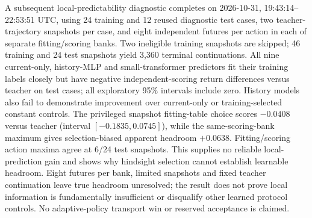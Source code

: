 \documentclass[11pt]{article}
\begin{document}
A subsequent local-predictability diagnostic completes on 2026-10-31,
19:43:14--22:53:51 UTC, using 24 training and 12 reused diagnostic test cases,
two teacher-trajectory snapshots per case, and eight independent futures per
action in each of separate fitting/scoring banks. Two ineligible training
snapshots are skipped; 46 training and 24 test snapshots yield 3,360 terminal
continuations. All nine current-only, history-MLP and small-transformer predictors
fit their training labels closely but have negative independent-scoring return
differences versus teacher on test cases; all exploratory 95\% intervals include
zero. History models also fail to demonstrate improvement over current-only or
training-selected constant controls. The privileged snapshot fitting-table
choice scores $-0.0408$ versus teacher (interval $[-0.1835,0.0745]$), while the
same-scoring-bank maximum gives selection-biased apparent headroom $+0.0638$.
Fitting/scoring action maxima agree at 6/24 test snapshots. This supplies no
reliable local-prediction gain and shows why hindsight selection cannot establish
learnable headroom. Eight futures per bank, limited snapshots and fixed teacher
continuation leave true headroom unresolved; the result does not prove local
information is fundamentally insufficient or disqualify other learned protocol
controls. No adaptive-policy transport win or reserved acceptance is claimed.
\end{document}
